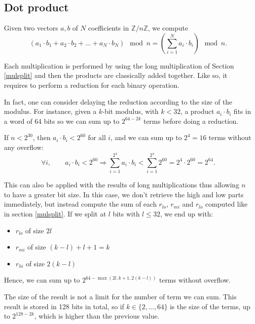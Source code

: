 \documentclass[a4paper]{article}
\begin{document}
\newpage
\subsection{Dot product}

Given two vectors $a,b$ of $N$ coefficients in $\mathbb{Z}/n\mathbb{Z}$, we compute
\[
\left(a_1\cdot b_1 + a_2\cdot b_2 + \dots + a_N\cdot b_N\right) \mod n = \left(\sum_{i=1}^N a_i\cdot b_i\right) \mod n.
\]

Each multiplication is performed by using the long multiplication of Section \ref{mulsplit} and then
the products are classically added together.
Like so, it requires to perform a reduction for each binary operation.

\bigskip
In fact, one can consider delaying the reduction according to the size of the modulus.
For instance, given a $k$-bit modulus, with $k < 32$, a product $a_i\cdot b_i$ fits in a word of 64 bits so
we can sum up to $2^{64 - 2k}$ terms before doing a reduction.

\begin{example}
    If $n < 2^{30}$, then $a_i\cdot b_i < 2^{60}$ for all $i$, and we can sum up to $2^4 = 16$ terms without any overflow:
    \[
    \forall i, \qquad a_i\cdot b_i < 2^{60}  
    \Longrightarrow \sum_{i=1}^{2^4} a_i\cdot b_i < \sum_{i=1}^{2^4} 2^{60} = 2^4 \cdot 2^{60} = 2^{64}.
    \]
\end{example}

\bigskip
This can also be applied with the results of long multiplications thus allowing $n$ to have a greater bit size.
In this case, we don't retrieve the high and low parts immediately, but instead
compute the sum of each $r_{lo}$, $r_{mi}$ and $r_{lo}$ computed like in section
\ref{mulsplit}. If we split at $l$ bits with $l \leq 32$, we end up with:
\begin{itemize}
    \item $r_{lo}$ of size $2 l$
    \item $r_{mi}$ of size $(k - l) + l + 1 = k$
    \item $r_{hi}$ of size $2 \left(k - l\right)$
\end{itemize}

Hence, we can sum up to
$2^{64 - \max\left(2 l, k + 1, 2 \left(k - l\right)\right)}$ terms without
overflow.


\begin{remark}
    The size of the result is not a limit for the number of term we can sum.
    This result is stored in 128 bits in total, so if $k \in \{2, \dots, 64\}$ is
    the size of the terms, up to $2^{128 - 2k}$, which is higher than the
    previous value.
\end{remark}
\end{document}
